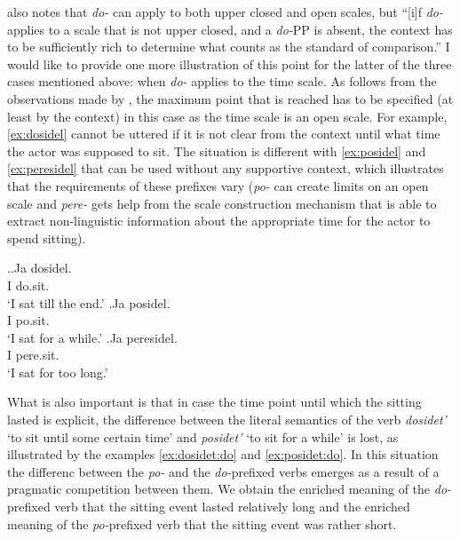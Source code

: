 \citet{Kagan:12} also notes that \textit{do-} can apply to both upper closed and open scales, but ``[i]f \textit{do-} applies to a scale that is not upper closed, and a \textit{do-}PP is absent, the context has to be sufficiently rich to determine what counts as the standard of comparison.'' I would like to provide one more illustration of this point for the latter of the three cases mentioned above: when \textit{do-} applies to the time scale. As follows from the observations made by \citet{Kagan:12}, the maximum point that is reached has to be specified (at least by the context) in this case as the time scale is an open scale. For example, \ref{ex:dosidel} cannot be uttered if it is not clear from the context until what time the actor was supposed to sit. The situation is different with \ref{ex:posidel} and \ref{ex:peresidel} that can be used without any supportive context, which illustrates that the requirements of these prefixes vary (\textit{po-} can create limits on an open scale and \textit{pere-} gets help from the scale construction mechanism that is able to extract non-linguistic information about the appropriate time for the actor to spend sitting).

\ex.\label{ex:dosidel}\ag.Ja dosidel.\\
I do.sit.\\
\vspace{0.5em}
`I sat till the end.'
\bg.\label{ex:posidel}Ja posidel.\\
I po.sit.\\
\vspace{0.5em}
`I sat for a while.'
\bg.\label{ex:peresidel}Ja peresidel.\\
I pere.sit.\\
\vspace{0.5em}
`I sat for too long.'

What is also important is that in case the time point until which the sitting lasted is explicit, the difference between the literal semantics of the verb \textit{dosidet'} `to sit until some certain time' and \textit{posidet'} `to sit for a while' is lost, as illustrated by the examples \ref{ex:dosidet:do} and \ref{ex:posidet:do}. In this situation the differenc between the \textit{po-} and the \textit{do-}prefixed verbs emerges as a result of a pragmatic competition between them. We obtain the enriched meaning of the \textit{do-}prefixed verb that the sitting event lasted relatively long and the enriched meaning of the \textit{po-}prefixed verb that the sitting event was rather short. 

